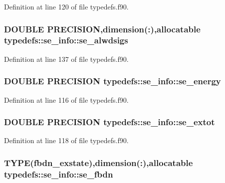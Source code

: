 Definition at line 120 of file typedefs.f90.\hypertarget{typetypedefs_1_1se__info_a8d0aa801ea2e0abab6173ad6eb3310c1}{
\subsubsection[{se\_\-alwdsigs}]{\setlength{\rightskip}{0pt plus 5cm}DOUBLE PRECISION,dimension(:),allocatable {\bf typedefs::se\_\-info::se\_\-alwdsigs}}}
\label{typetypedefs_1_1se__info_a8d0aa801ea2e0abab6173ad6eb3310c1}


Definition at line 137 of file typedefs.f90.\hypertarget{typetypedefs_1_1se__info_a1cb4fd9197cbe6e491f8c015385d3983}{
\subsubsection[{se\_\-energy}]{\setlength{\rightskip}{0pt plus 5cm}DOUBLE PRECISION {\bf typedefs::se\_\-info::se\_\-energy}}}
\label{typetypedefs_1_1se__info_a1cb4fd9197cbe6e491f8c015385d3983}


Definition at line 116 of file typedefs.f90.\hypertarget{typetypedefs_1_1se__info_aaeb12f09d4e2ae1f4545c2a9ee1b3b88}{
\subsubsection[{se\_\-extot}]{\setlength{\rightskip}{0pt plus 5cm}DOUBLE PRECISION {\bf typedefs::se\_\-info::se\_\-extot}}}
\label{typetypedefs_1_1se__info_aaeb12f09d4e2ae1f4545c2a9ee1b3b88}


Definition at line 118 of file typedefs.f90.\hypertarget{typetypedefs_1_1se__info_ae86fd99616525aef71601e1c8036f11a}{
\subsubsection[{se\_\-fbdn}]{\setlength{\rightskip}{0pt plus 5cm}TYPE({\bf fbdn\_\-exstate}),dimension(:),allocatable {\bf typedefs::se\_\-info::se\_\-fbdn}}}
\label{typetypedefs_1_1se__info_ae86fd99616525aef71601e1c8036f11a}


